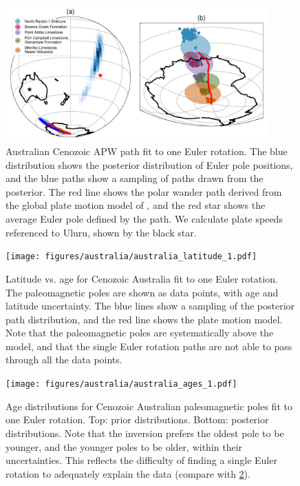 \documentclass[preprint,12pt,authoryear]{elsarticle}
\begin{document}
\begin{figure}
\includegraphics[width=0.9\textwidth]{figures/australia/australia_paths_1.pdf}
\caption[Australian Cenozoic APW path fit to one Euler rotation.]{Australian Cenozoic APW path fit to one Euler rotation. The blue distribution shows the posterior distribution of Euler pole positions, and the blue paths show a sampling of paths drawn from the posterior. The red line shows the polar wander path derived from the global plate motion model of \citet{seton2012global}, and the red star shows the average Euler pole defined by the \citet{seton2012global} path. We calculate plate speeds referenced to Uluru, shown by the black star.}
\label{fig:australia_paths_1}
\end{figure}
\begin{figure}
\texttt{[image: figures/australia/australia\_latitude\_1.pdf]}
\caption[Latitude vs. age for Cenozoic Australia fit to one Euler rotation]{Latitude vs. age for Cenozoic Australia fit to one Euler rotation. The paleomagnetic poles are shown as data points, with age and latitude uncertainty. The blue lines show a sampling of the posterior path distribution, and the red line shows the \citet{seton2012global} plate motion model. Note that the paleomagnetic poles are systematically above the \citet{seton2012global} model, and that the single Euler rotation paths are not able to pass through all the data points.}
\label{fig:australia_latitude_1}
\end{figure}
\begin{figure}
\texttt{[image: figures/australia/australia\_ages\_1.pdf]}
\caption[Age distributions for Cenozoic Australian paleomagnetic poles fit to one Euler rotation.] {Age distributions for Cenozoic Australian paleomagnetic poles fit to one Euler rotation. Top: prior distributions. Bottom: posterior distributions. Note that the inversion prefers the oldest pole to be younger, and the younger poles to be older, within their uncertainties. This reflects the difficulty of finding a single Euler rotation to adequately explain the data (compare with \ref{fig:australia_latitude_1}). }
\label{fig:australia_ages_1}
\end{figure}
\end{document}
